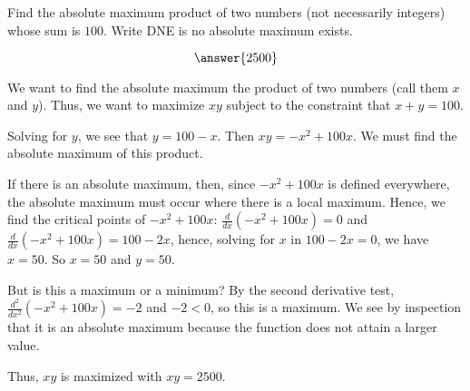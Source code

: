 \documentclass{ximera}
\author{Gregory Hartman \and Matthew Carr}
\begin{document}
\begin{exercise}



Find the absolute maximum product of two numbers (not necessarily integers) whose sum is $100$. Write DNE is no absolute maximum exists. 

\begin{prompt}
\[
\answer{2500}
\]
\end{prompt}

\begin{hint}
We want to find the absolute maximum the product of two numbers (call them $x$ and $y$). Thus, we want to maximize $xy$ subject to the constraint that $x+y=100$.
\end{hint}
\begin{hint}
Solving for $y$, we see that $y=100-x$. Then $xy=-x^2+100x$. We must find the absolute maximum of this product. 
\end{hint}
\begin{hint}
If there is an absolute maximum, then, since $-x^2+100x$ is defined everywhere, the absolute maximum must occur where there is a local maximum. Hence, we find the critical points of $-x^2+100x$: $\frac{d}{dx}(-x^2+100x)=0$ and $\frac{d}{dx}(-x^2+100x)=100-2x$, hence, solving for $x$ in $100-2x=0$, we have $x=50$. So $x=50$ and $y=50$.

But is this a maximum or a minimum? By the second derivative test, $\frac{d^2}{dx^2}(-x^2+100x)=-2$ and $-2<0$, so this is a maximum. We see by inspection that it is an absolute maximum because the function does not attain a larger value.

Thus, $xy$ is maximized with $xy=2500$. 
\end{hint}



\end{exercise}
\end{document}
